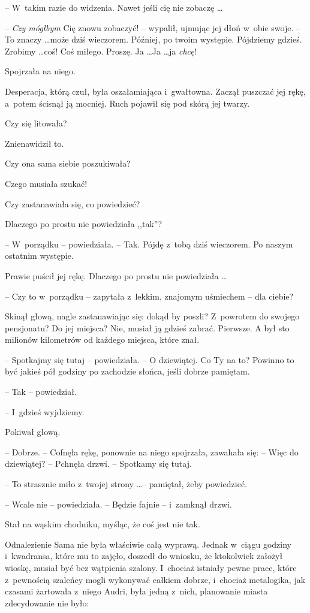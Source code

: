 \documentclass[oneside,polish,11pt,rmheadings]{mwbk}
\begin{document}
 -- W~takim razie do widzenia. Nawet jeśli cię nie zobaczę \ldots  

-- \textit{Czy mógłbym }Cię znowu zobaczyć! -- wypalił, ujmując jej dłoń w~obie swoje. -- To znaczy \ldots  może dziś wieczorem. Później, po twoim występie. Pójdziemy gdzieś. Zrobimy \ldots  coś! Coś miłego. Proszę. Ja \ldots   Ja \ldots  ja \textit{chcę}! 

Spojrzała na niego. 

Desperacja, którą czuł, była oszałamiająca i~gwałtowna. Zaczął puszczać jej rękę, a~potem ścisnął ją mocniej. Ruch pojawił się pod skórą jej twarzy. 

Czy się litowała? 

Znienawidził to. 

Czy ona sama siebie poszukiwała? 

Czego musiała szukać! 

Czy zastanawiała się, co powiedzieć? 

Dlaczego po prostu nie powiedziała ,,tak''? 

-- W~porządku -- powiedziała. -- Tak. Pójdę z~tobą dziś wieczorem. Po naszym ostatnim występie. 

Prawie puścił jej rękę. Dlaczego po prostu nie powiedziała \ldots  

-- Czy to w~porządku -- zapytała z~lekkim, znajomym uśmiechem -- dla ciebie? 

Skinął głową, nagle zastanawiając się: dokąd by poszli? Z~powrotem do swojego pensjonatu? Do jej miejsca? Nie, musiał ją gdzieś zabrać. Pierwsze. A był sto milionów kilometrów od każdego miejsca, które znał. 

-- Spotkajmy się tutaj -- powiedziała. -- O dziewiątej. Co Ty na to? Powinno to być jakieś pół godziny po zachodzie słońca, jeśli dobrze pamiętam. 

-- Tak -- powiedział. 

-- I~gdzieś wyjdziemy. 

Pokiwał głową. 

-- Dobrze. -- Cofnęła rękę, ponownie na niego spojrzała, zawahała się: -- Więc do dziewiątej? -- Pchnęła drzwi. -- Spotkamy się tutaj. 

-- To strasznie miło z~twojej strony \ldots  -- pamiętał, żeby powiedzieć. 

-- Wcale nie -- powiedziała. -- Będzie fajnie -- i~zamknął drzwi. 

Stał na wąskim chodniku, myśląc, że coś jest nie tak. 

Odnalezienie Sama nie była właściwie całą wyprawą. Jednak w~ciągu godziny i~kwadransa, które mu to zajęło, doszedł do wniosku, że ktokolwiek założył wioskę, musiał być bez wątpienia szalony. I~chociaż istniały pewne prace, które z~pewnością szaleńcy mogli wykonywać całkiem dobrze, i~chociaż metalogika, jak czasami żartowała z~niego Audri, była jedną z~nich, planowanie miasta zdecydowanie nie było: 
\end{document}

